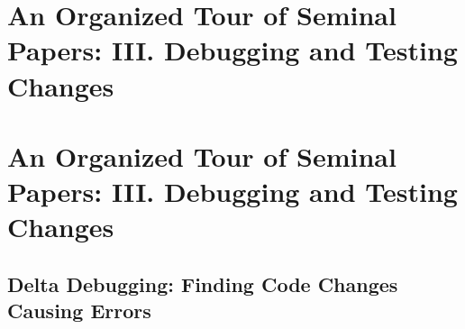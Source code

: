 \documentclass[runningheads,a4paper]{llncs}
\begin{document}

\section{An Organized Tour of Seminal Papers: III. Debugging and Testing Changes}
\label{sec:debugtest}


\section{An Organized Tour of Seminal Papers: III. Debugging and Testing Changes} 


\subsection{Delta Debugging: Finding Code Changes Causing Errors}
\end{document}
